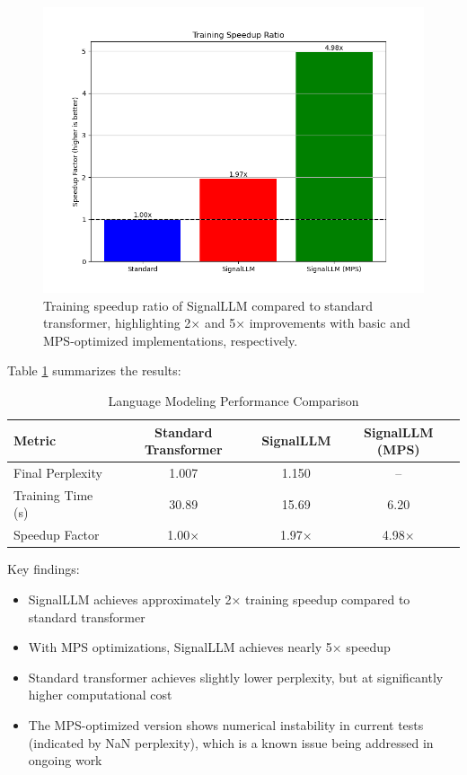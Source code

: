 \documentclass[10pt,twocolumn,letterpaper]{article}
\begin{document}
\begin{figure}[t]
    \centering
    \includegraphics[width=0.9\linewidth]{report_assets/training_speedup.png}
    \caption{Training speedup ratio of SignalLLM compared to standard transformer, highlighting 2× and 5× improvements with basic and MPS-optimized implementations, respectively.}
    \label{fig:training_speedup}
\end{figure}

Table \ref{tab:nlp_performance} summarizes the results:

\begin{table}[t]
\centering
\caption{Language Modeling Performance Comparison}
\begin{tabular}{@{}lccc@{}}
\toprule
Metric & Standard Transformer & SignalLLM & SignalLLM (MPS) \\ \midrule
Final Perplexity & 1.007 & 1.150 & -- \\
Training Time (s) & 30.89 & 15.69 & 6.20 \\
Speedup Factor & 1.00× & 1.97× & 4.98× \\
\bottomrule
\end{tabular}
\label{tab:nlp_performance}
\end{table}

Key findings:

\begin{itemize}
    \item SignalLLM achieves approximately 2× training speedup compared to standard transformer
    \item With MPS optimizations, SignalLLM achieves nearly 5× speedup
    \item Standard transformer achieves slightly lower perplexity, but at significantly higher computational cost
    \item The MPS-optimized version shows numerical instability in current tests (indicated by NaN perplexity), which is a known issue being addressed in ongoing work
\end{itemize}
\end{document}
